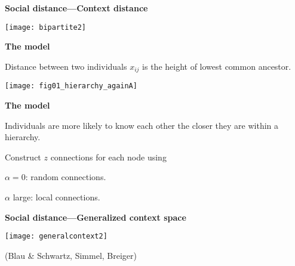 



  \textbf{Social distance---Context distance}

  \centering
  \texttt{[image: bipartite2]}


  \textbf{The model}

  Distance between two individuals $x_{ij}$ 
  is the height of lowest common ancestor.

  \begin{center}
    \texttt{[image: fig01\_hierarchy\_againA]}
  \end{center}



  \textbf{The model}

  
   
    Individuals are more
    likely to know each other the closer they are
    within a hierarchy.
   
    Construct $z$ connections for each node
    using
   
    \alert{$\alpha=0$}: random connections.
   
    \alert{$\alpha$ large}: local connections.
  



  \textbf{Social distance---Generalized context space}

  \centering
  \texttt{[image: generalcontext2]}

  (Blau \& Schwartz, Simmel, Breiger)

% 
% 
% 
% 

